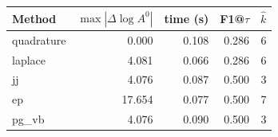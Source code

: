 \begin{tabular}{lrrrr}\toprule
Method & $\max|\Delta \log A^0|$ & time (s) & F1@$\tau$ & $\hat{k}$\\\midrule
quadrature & 0.000 & 0.108 & 0.286 & 6\\
laplace & 4.081 & 0.066 & 0.286 & 6\\
jj & 4.076 & 0.087 & 0.500 & 3\\
ep & 17.654 & 0.077 & 0.500 & 7\\
pg\_vb & 4.076 & 0.090 & 0.500 & 3\\
\bottomrule\end{tabular}

